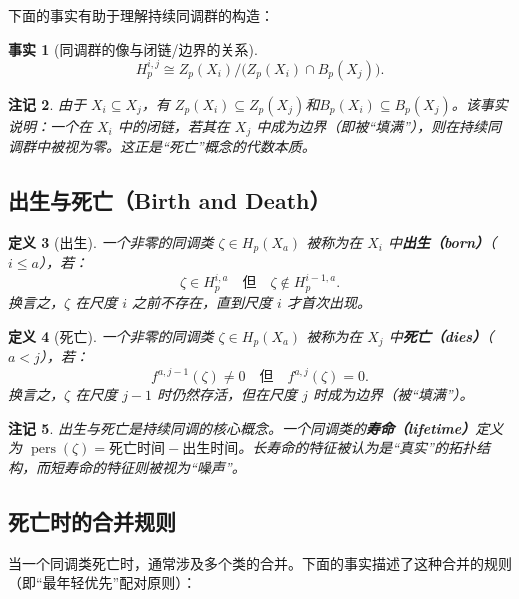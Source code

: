 \documentclass[UTF8]{ctexart}
\newtheorem{definition}{定义}[section]
\newtheorem{remark}[definition]{注记}
\newtheorem{fact}[definition]{事实}
\begin{document}
下面的事实有助于理解持续同调群的构造：

\begin{fact}[同调群的像与闭链/边界的关系]
\label{fact:persistent-image}
\[
H_p^{i,j} \cong Z_p(X_i) / \big(Z_p(X_i) \cap B_p(X_j)\big).
\]
\end{fact}

\begin{remark}
由于 \(X_i \subseteq X_j\)，有 \(Z_p(X_i) \subseteq Z_p(X_j)\)和\(B_p(X_i) \subseteq B_p(X_j)\)。该事实说明：一个在 \(X_i\) 中的闭链，若其在 \(X_j\) 中成为边界（即被“填满”），则在持续同调群中被视为零。这正是“死亡”概念的代数本质。
\end{remark}

\subsection{出生与死亡（Birth and Death）}
\label{subsec:birth-death}

\begin{definition}[出生]
\label{def:birth}
一个非零的同调类 \(\zeta \in H_p(X_a)\) 被称为在 \(X_i\) 中\textbf{出生（born）}（\(i \le a\)），若：
\[
\zeta \in H_p^{i,a} \quad \text{但} \quad \zeta \notin H_p^{i-1,a}.
\]
换言之，\(\zeta\) 在尺度 \(i\) 之前不存在，直到尺度 \(i\) 才首次出现。
\end{definition}

\begin{definition}[死亡]
\label{def:death}
一个非零的同调类 \(\zeta \in H_p(X_a)\) 被称为在 \(X_j\) 中\textbf{死亡（dies）}（\(a < j\)），若：
\[
f^{a,j-1}(\zeta) \neq 0 \quad \text{但} \quad f^{a,j}(\zeta) = 0.
\]
换言之，\(\zeta\) 在尺度 \(j-1\) 时仍然存活，但在尺度 \(j\) 时成为边界（被“填满”）。
\end{definition}

\begin{remark}
出生与死亡是持续同调的核心概念。一个同调类的\textbf{寿命（lifetime）}定义为 \(\operatorname{pers}(\zeta) = \text{死亡时间} - \text{出生时间}\)。长寿命的特征被认为是“真实”的拓扑结构，而短寿命的特征则被视为“噪声”。
\end{remark}

\subsection{死亡时的合并规则}
\label{subsec:merging-rule}

当一个同调类死亡时，通常涉及多个类的合并。下面的事实描述了这种合并的规则（即“最年轻优先”配对原则）：
\end{document}
